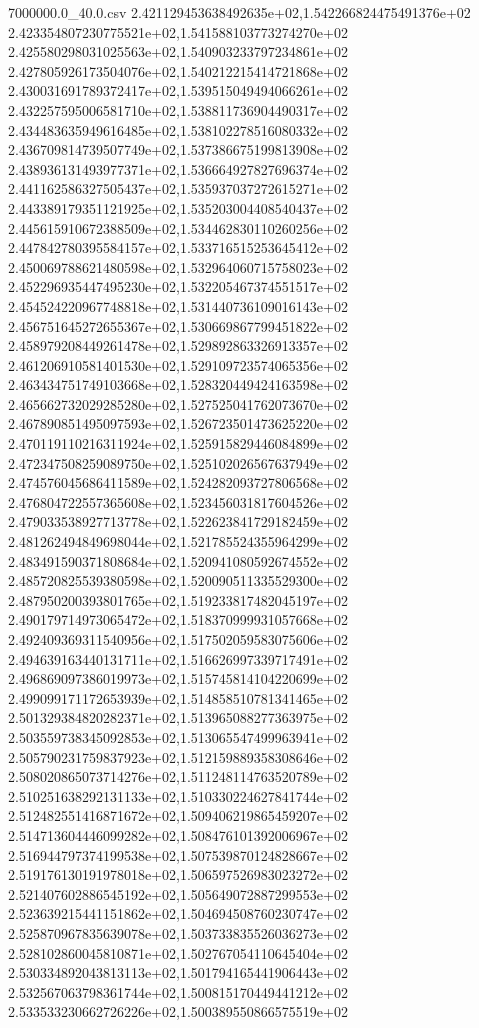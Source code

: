 \begin{filecontents*}{7000000.0_40.0.csv}
2.421129453638492635e+02,1.542266824475491376e+02
2.423354807230775521e+02,1.541588103773274270e+02
2.425580298031025563e+02,1.540903233797234861e+02
2.427805926173504076e+02,1.540212215414721868e+02
2.430031691789372417e+02,1.539515049494066261e+02
2.432257595006581710e+02,1.538811736904490317e+02
2.434483635949616485e+02,1.538102278516080332e+02
2.436709814739507749e+02,1.537386675199813908e+02
2.438936131493977371e+02,1.536664927827696374e+02
2.441162586327505437e+02,1.535937037272615271e+02
2.443389179351121925e+02,1.535203004408540437e+02
2.445615910672388509e+02,1.534462830110260256e+02
2.447842780395584157e+02,1.533716515253645412e+02
2.450069788621480598e+02,1.532964060715758023e+02
2.452296935447495230e+02,1.532205467374551517e+02
2.454524220967748818e+02,1.531440736109016143e+02
2.456751645272655367e+02,1.530669867799451822e+02
2.458979208449261478e+02,1.529892863326913357e+02
2.461206910581401530e+02,1.529109723574065356e+02
2.463434751749103668e+02,1.528320449424163598e+02
2.465662732029285280e+02,1.527525041762073670e+02
2.467890851495097593e+02,1.526723501473625220e+02
2.470119110216311924e+02,1.525915829446084899e+02
2.472347508259089750e+02,1.525102026567637949e+02
2.474576045686411589e+02,1.524282093727806568e+02
2.476804722557365608e+02,1.523456031817604526e+02
2.479033538927713778e+02,1.522623841729182459e+02
2.481262494849698044e+02,1.521785524355964299e+02
2.483491590371808684e+02,1.520941080592674552e+02
2.485720825539380598e+02,1.520090511335529300e+02
2.487950200393801765e+02,1.519233817482045197e+02
2.490179714973065472e+02,1.518370999931057668e+02
2.492409369311540956e+02,1.517502059583075606e+02
2.494639163440131711e+02,1.516626997339717491e+02
2.496869097386019973e+02,1.515745814104220699e+02
2.499099171172653939e+02,1.514858510781341465e+02
2.501329384820282371e+02,1.513965088277363975e+02
2.503559738345092853e+02,1.513065547499963941e+02
2.505790231759837923e+02,1.512159889358308646e+02
2.508020865073714276e+02,1.511248114763520789e+02
2.510251638292131133e+02,1.510330224627841744e+02
2.512482551416871672e+02,1.509406219865459207e+02
2.514713604446099282e+02,1.508476101392006967e+02
2.516944797374199538e+02,1.507539870124828667e+02
2.519176130191978018e+02,1.506597526983023272e+02
2.521407602886545192e+02,1.505649072887299553e+02
2.523639215441151862e+02,1.504694508760230747e+02
2.525870967835639078e+02,1.503733835526036273e+02
2.528102860045810871e+02,1.502767054110645404e+02
2.530334892043813113e+02,1.501794165441906443e+02
2.532567063798361744e+02,1.500815170449441212e+02
2.533533230662726226e+02,1.500389550866575519e+02

\end{filecontents*}
